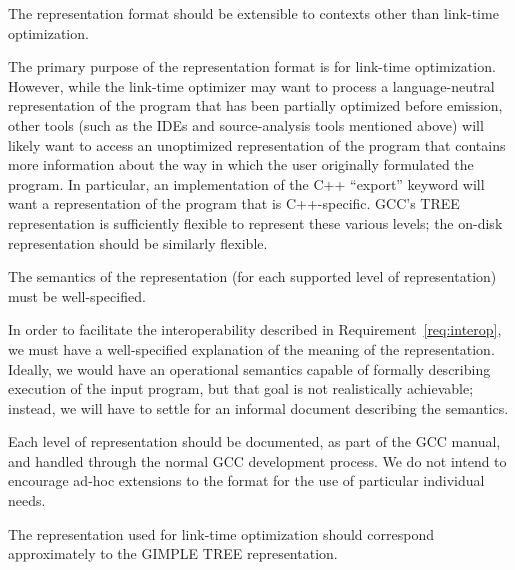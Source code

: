 \begin{requirement}
  The representation format should be extensible to contexts other
  than link-time optimization.
\end{requirement}

\begin{rationale}
  The primary purpose of the representation format is for link-time
  optimization.  However, while the link-time optimizer may want to
  process a language-neutral representation of the program that has
  been partially optimized before emission, other tools (such as the
  IDEs and source-analysis tools mentioned above) will likely want to
  access an unoptimized representation of the program that contains
  more information about the way in which the user originally
  formulated the program.  In particular, an implementation of the C++
  ``export'' keyword will want a representation of the program that is
  C++-specific.  GCC's TREE representation is sufficiently flexible to
  represent these various levels; the on-disk representation should be
  similarly flexible.
\end{rationale}

\begin{requirement}
  The semantics of the representation (for each supported level of
  representation) must be well-specified.
\end{requirement}

\begin{rationale}
  In order to facilitate the interoperability described in
  Requirement~\ref{req:interop}, we must have a well-specified
  explanation of the meaning of the representation.  Ideally, we would
  have an operational semantics capable of formally describing
  execution of the input program, but that goal is not realistically
  achievable; instead, we will have to settle for an informal document
  describing the semantics.

  Each level of representation should be documented, as part of the
  GCC manual, and handled through the normal GCC development process.
  We do not intend to encourage ad-hoc extensions to the format for
  the use of particular individual needs.
\end{rationale}

\begin{requirement}
  The representation used for link-time optimization should correspond
  approximately to the GIMPLE TREE representation.
\end{requirement}

